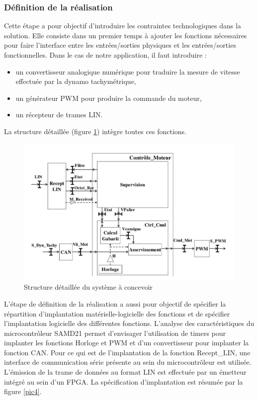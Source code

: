 \documentclass[a4paper]{article}
\begin{document}
	\subsubsection{Définition de la réalisation}
	Cette étape a pour objectif d’introduire les contraintes technologiques dans la solution. Elle consiste dans un premier temps à ajouter les fonctions nécessaires pour faire l’interface entre les entrées/sorties physiques et les entrées/sorties fonctionnelles. Dans le cas de notre application, il faut introduire :
	\begin{itemize}
		\item un convertisseur analogique numérique pour traduire la mesure de vitesse effectuée par la dynamo tachymétrique,
		\item un générateur PWM pour produire la commande du moteur,
		\item un récepteur de trames LIN.
	\end{itemize}
	La structure détaillée (figure \ref{pic3}) intègre toutes ces fonctions.\\
	\begin{figure}[htbp]
		\centering
		\includegraphics[width=0.9\linewidth]{Structure_systeme.jpg}
		\caption{Structure détaillée du système à concevoir}
		\label{pic3}
	\end{figure}
	L’étape de définition de la réalisation a aussi pour objectif de spécifier la répartition d’implantation matérielle-logicielle des fonctions et de spécifier l’implantation logicielle des différentes fonctions. L’analyse des caractéristiques du microcontrôleur SAMD21 permet d’envisager l’utilisation de timers pour implanter les fonctions Horloge et PWM et d’un convertisseur pour implanter la fonction CAN. Pour ce qui est de l’implantation de la fonction Recept\_LIN, une interface de communication série présente au sein du microcontrôleur est utilisée. L’émission de la trame de données au format LIN est effectuée par un émetteur intégré au sein d’un FPGA. La spécification d’implantation est résumée par la figure \ref{pic4}.
\end{document}
